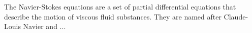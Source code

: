 The Navier-Stokes equations are a set of partial differential equations that describe the motion of viscous fluid substances. They are named after Claude-Louis Navier and ...